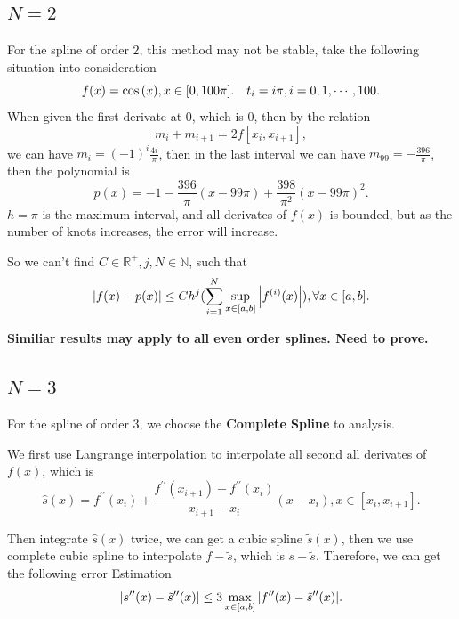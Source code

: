 \documentclass[a4paper]{article}
\begin{document}
\subsection{$N=2$}
For the spline of order $2$, this method may not be stable, take the following situation into consideration
\begin{equation}
    f(x) = \cos\qty(x), x \in [0, 100 \pi]. \quad
    t_i = i \pi, i = 0, 1, \cdots, 100.
\end{equation}
When given the first derivate at $0$, which is $0$, then by the relation
\begin{equation}
    m_i + m_{i+1} = 2 f[x_i, x_{i+1}],
\end{equation}
we can have $m_i = (-1)^i \frac{4 i}{\pi}$, then in the last interval we can have 
$m_{99} = -\frac{396}{\pi}$, then the polynomial is 
\begin{equation}
    p(x) = -1 - \frac{396}{\pi}(x-99 \pi) + \frac{398}{\pi^2}(x-99 \pi)^2.
\end{equation}
$h = \pi$ is the maximum interval, and all derivates of $f(x)$ is bounded, but as the number of knots increases, the error will increase.

So we can't find $C\in \mathbb{R}^{+}, j, N\in \mathbb{N}$, such that 
\begin{equation}
    \abs{f(x) - p(x)} \leq C h^j (\sum_{i=1}^{N} \sup_{x \in [a,b]} \abs{f^{(i)}(x)}), \forall x \in [a,b].
\end{equation}

\textbf{Similiar results may apply to all even order splines. Need to prove.}

\subsection{$N=3$}
For the spline of order $3$, we choose the \textbf{Complete Spline} to analysis. 

We first use Langrange interpolation to interpolate all second all derivates of $f(x)$, which is
\begin{equation}
    \hat{s}(x) = f^{\prime \prime}(x_i) + \frac{f^{\prime \prime} (x_{i+1}) - f^{\prime \prime}(x_i)}{x_{i+1}-x_i} (x-x_i), x \in [x_i, x_{i+1}].
\end{equation}

Then integrate $\hat{s}(x)$ twice, we can get a cubic spline $\tilde{s}(x)$, then we use complete cubic spline to interpolate 
$f - \tilde{s}$, which is $s - \tilde{s}$. Therefore, we can get the following error Estimation
\begin{equation}
    \abs{s^{\prime \prime}(x) - \tilde{s}^{\prime \prime}(x)} \leq 3 \max_{x \in [a,b]} \abs{f^{\prime \prime}(x) - \tilde{s}^{\prime \prime}(x)}.
\end{equation}
\end{document}
